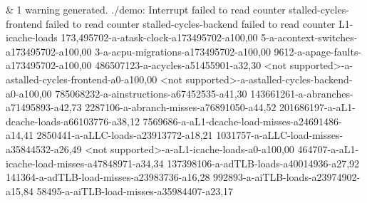 &
1 warning generated. ./demo: Interrupt failed to read counter stalled-cycles-frontend failed to read counter stalled-cycles-backend failed to read counter L1-icache-loads 173,495702-a-atask-clock-a173495702-a100,00 5-a-acontext-switches-a173495702-a100,00 3-a-acpu-migrations-a173495702-a100,00 9612-a-apage-faults-a173495702-a100,00 486507123-a-acycles-a51455901-a32,30 <not supported>-a-astalled-cycles-frontend-a0-a100,00 <not supported>-a-astalled-cycles-backend-a0-a100,00 785068232-a-ainstructions-a67452535-a41,30 143661261-a-abranches-a71495893-a42,73 2287106-a-abranch-misses-a76891050-a44,52 201686197-a-aL1-dcache-loads-a66103776-a38,12 7569686-a-aL1-dcache-load-misses-a24691486-a14,41 2850441-a-aLLC-loads-a23913772-a18,21 1031757-a-aLLC-load-misses-a35844532-a26,49 <not supported>-a-aL1-icache-loads-a0-a100,00 464707-a-aL1-icache-load-misses-a47848971-a34,34 137398106-a-adTLB-loads-a40014936-a27,92 141364-a-adTLB-load-misses-a23983736-a16,28 992893-a-aiTLB-loads-a23974902-a15,84 58495-a-aiTLB-load-misses-a35984407-a23,17
